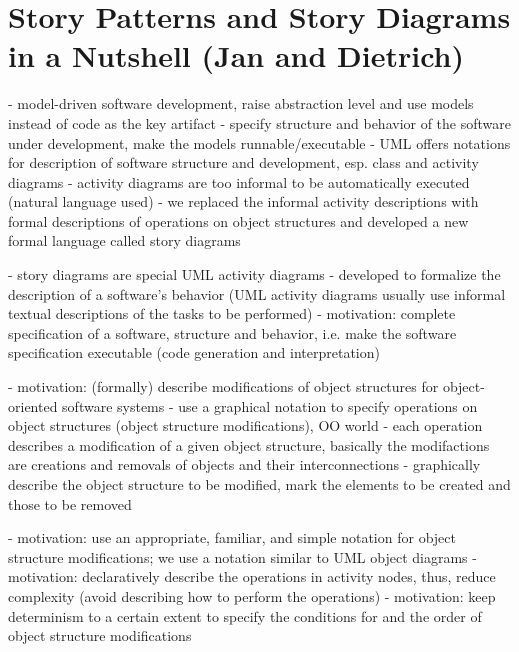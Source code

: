 \section{Story Patterns and Story Diagrams in a Nutshell (Jan and Dietrich)} \label{sec:Overview}


- model-driven software development, raise abstraction level and use models instead of code as the key artifact
- specify structure and behavior of the software under development, make the models runnable/executable
- UML offers notations for description of software structure and development, esp. class and activity diagrams
- activity diagrams are too informal to be automatically executed (natural language used)
- we replaced the informal activity descriptions with formal descriptions of operations on object structures and developed a new formal language called story diagrams

- story diagrams are special UML activity diagrams
- developed to formalize the description of a software's behavior (UML activity diagrams usually use informal textual descriptions of the tasks to be performed)
- motivation: complete specification of a software, structure and behavior, i.e. make the software specification executable (code generation and interpretation)

- motivation: (formally) describe modifications of object structures for object-oriented software systems
- use a graphical notation to specify operations on object structures (object structure modifications), OO world
- each operation describes a modification of a given object structure, basically the modifactions are creations and removals of objects and their interconnections
- graphically describe the object structure to be modified, mark the elements to be created and those to be removed


- motivation: use an appropriate, familiar, and simple notation for object structure modifications; we use a notation similar to UML object diagrams
- motivation: declaratively describe the operations in activity nodes, thus, reduce complexity (avoid describing how to perform the operations)
- motivation: keep determinism to a certain extent to specify the conditions for and the order of object structure modifications


